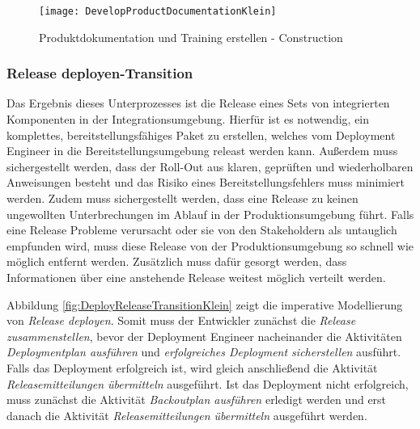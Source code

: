 \begin{figure}[!htbp]
\begin{center}
  \texttt{[image: DevelopProductDocumentationKlein]} %
  \caption{Produktdokumentation und Training erstellen - Construction}
  \label{fig:DevelopProductDocumentationKlein}
\end{center}
\end{figure}


\subsubsection{Release deployen-Transition}


Das Ergebnis dieses Unterprozesses ist die Release eines Sets von integrierten Komponenten in der Integrationsumgebung. \newline
Hierfür ist es notwendig, ein komplettes, bereitstellungsfähiges Paket zu erstellen, welches vom Deployment Engineer in die Bereitstellungsumgebung releast werden kann.\newline
 Außerdem muss sichergestellt werden, dass der Roll-Out aus klaren, geprüften und wiederholbaren Anweisungen besteht und das Risiko eines Bereitstellungsfehlers muss minimiert werden. \newline
 Zudem muss sichergestellt werden, dass eine Release zu keinen ungewollten Unterbrechungen im Ablauf in der Produktionsumgebung führt. \newline
 Falls eine Release Probleme verursacht oder sie von den Stakeholdern als untauglich empfunden wird, muss diese Release von der Produktionsumgebung so schnell wie möglich entfernt werden. \newline
 Zusätzlich muss dafür gesorgt werden, dass Informationen über eine anstehende Release weitest möglich verteilt werden.\newline
 
  Abbildung \ref{fig:DeployReleaseTransitionKlein} zeigt die imperative Modellierung von \textit{Release deployen}.\newline
  Somit muss der Entwickler zunächst die \textit{Release zusammenstellen}, bevor der Deployment Engineer nacheinander die Aktivitäten \textit{Deploymentplan ausführen} und \textit{erfolgreiches Deployment sicherstellen} ausführt. Falls das Deployment erfolgreich ist, wird gleich anschließend die Aktivität \textit{Releasemitteilungen übermitteln} ausgeführt. Ist das Deployment nicht erfolgreich, muss zunächst die Aktivität \textit{Backoutplan ausführen} erledigt werden und erst danach die Aktivität \textit{Releasemitteilungen übermitteln} ausgeführt werden.



